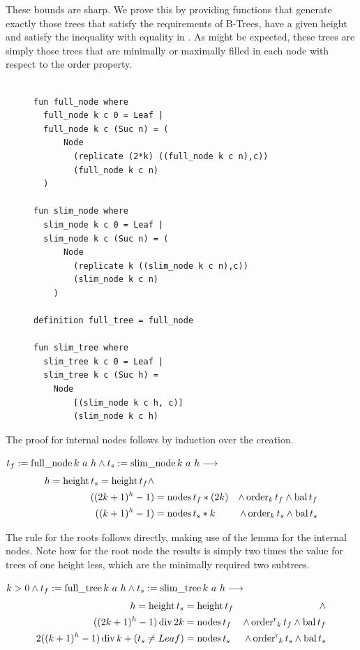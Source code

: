 These bounds are sharp.
We prove this by providing 
functions that generate exactly those trees
that satisfy the requirements of B-Trees, have a given height
and satisfy the inequality with equality in .
As might be expected, these trees are simply those trees
that are minimally or maximally filled in each node with respect
to the order property.

\begin{figure}
\begin{lstlisting}[mathescape=true, language=Isabelle,label={lst:sharp-trees-def},
    caption={The functions generating trees with minimal size and maximal size for given height.}]

fun full_node where
  full_node k c 0 = Leaf |
  full_node k c (Suc n) = (
      Node
        (replicate (2*k) ((full_node k c n),c))
        (full_node k c n)
  )

fun slim_node where
  slim_node k c 0 = Leaf |
  slim_node k c (Suc n) = (
      Node
        (replicate k ((slim_node k c n),c))
        (slim_node k c n)
    )

definition full_tree = full_node

fun slim_tree where
  slim_tree k c 0 = Leaf |
  slim_tree k c (Suc h) =
    Node
        [(slim_node k c h, c)]
        (slim_node k c h)

\end{lstlisting}
\end{figure}

The proof for internal nodes follows by induction over the creation.

\begin{lemma} $t_f := \operatorname{full\_node} k\ a\ h \wedge t_s := \operatorname{slim\_node} k\ a\ h \longrightarrow$
    \begin{align}
    h = \operatorname{height} t_s = \operatorname{height} t_f \wedge \\
    ((2k+1)^h - 1) &= \operatorname{nodes} t_f * (2k) &\wedge \operatorname{order}_k t_f \wedge \operatorname{bal} t_f \\ 
    ((k+1)^h - 1) &= \operatorname{nodes} t_s * k  &\wedge \operatorname{order}_k t_s \wedge \operatorname{bal} t_s
    \end{align}
\end{lemma}

The rule for the roots follows directly, making use of the lemma
for the internal nodes.
Note how for the root node the results is simply two times the
value for trees of one height less, which are the minimally
required two subtrees.

\begin{theorem}
    $k > 0 \wedge t_f := \operatorname{full\_tree} k\ a\ h \wedge t_s := \operatorname{slim\_tree} k\ a\ h \longrightarrow$
    \begin{align*}
    h = \operatorname{height} t_s &= \operatorname{height} t_f &\wedge \\
        ((2k+1)^h - 1) \operatorname{div} 2k &= \operatorname{nodes} t_f &\wedge \operatorname{order^r}_k t_f \wedge \operatorname{bal} t_f \\ 
        2((k+1)^h - 1) \operatorname{div} k + (t_s \neq Leaf) &= \operatorname{nodes} t_s &\wedge \operatorname{order^r}_k t_s \wedge \operatorname{bal} t_s
    \end{align*}
\end{theorem}


